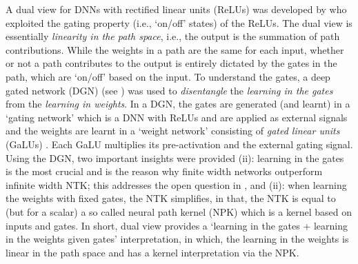 A dual view for DNNs with rectified linear units (ReLUs) was developed by \cite{npk} who exploited the gating property (i.e., `on/off' states) of the ReLUs. The dual view is essentially \emph{linearity in the path space}, i.e., the output is the summation of path contributions.  While the weights in a path are the same for each input, whether or not a path contributes to the output is entirely dictated by the gates in the path, which are `on/off' based on the input. To understand the gates, a deep gated network (DGN) (see ) was used to \emph{disentangle} the \emph{learning in the gates} from the \emph{learning in weights}. In a DGN,  the gates are generated (and learnt) in a `gating network' which is a DNN with ReLUs and are applied as external signals and the weights are learnt in a `weight network' consisting of \emph{gated linear units} (GaLUs) \citep{sss}. Each GaLU multiplies its pre-activation and the external gating signal. Using the DGN, two important insights were provided  (ii): learning in the gates is the most crucial and is the reason why finite width networks outperform infinite width NTK; this addresses the open question in \cite{arora2019exact}, and (ii): when learning the weights with fixed gates, the NTK simplifies, in that, the NTK is equal to (but for a scalar) a so called neural path kernel (NPK) which is a kernel based on inputs and gates. In short, dual view provides a `learning in the gates + learning in the weights given gates' interpretation, in which, the learning in the weights is linear in the path space and has a kernel interpretation via the NPK.


